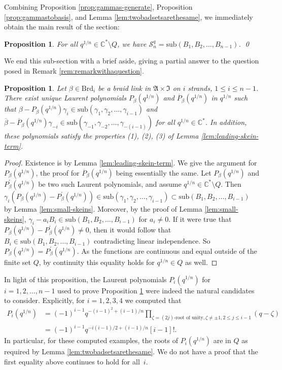 \documentclass[12pt,
	]{amsart}
\newtheorem{proposition}[theorem]{Proposition}
\theoremstyle{definition}
\renewcommand{\bar}{\overline}
\newcommand{\mrm}[1]{\mathrm{#1}}
\newcommand{\mbb}[1]{\mathbb{#1}}
\newcommand{\mcal}[1]{\mathcal{#1}}
\newcommand{\mfrak}[1]{\mathfrak{#1}}
\newcommand{\lp}{\left(}\newcommand{\rp}{\right)}
\newcommand{\sub}[1]{\mrm{sub}\lp#1\rp}
\newcommand{\rev}[1]{\bar{#1}}
\newcommand{\C}{\mbb{C}}
\newcommand{\sC}{\C^\ast}
\newcommand{\sk}{\mcal{S}_n^q}
\newcommand{\ann}{\mfrak{A}}
\newcommand{\intt}{\mfrak{I}}
\newcommand{\badset}{Q}
\newcommand{\qroot}{q^{1/n}}
\newcommand{\braid}{\mrm{Brd}}
\begin{document}
Combining Proposition \ref{prop:gammas-generate}, Proposition \ref{prop:gammastobasis}, and Lemma \ref{lem:twobadsetsarethesame}, we immediately obtain the main result of the section:

\begin{proposition}\label{cor:basisgenerates}
For all $\qroot\in\sC\setminus\badset$, we have $\sk=\sub{B_1,B_2,\dots,B_{n-1}}$.  \qed
\end{proposition}

We end this sub-section with a brief aside, giving a partial answer to the question posed in Remark \ref{rem:remarkwithaquestion}.    

\begin{proposition}
Let $\beta\in\braid_i$ be a braid link in $\ann\times\intt$ on $i$ strands, $1\leq i\leq n-1$.  There exist unique Laurent polynomials $P_\beta(\qroot)$ and $\rev{P}_\beta(\qroot)$ in $\qroot$ such that $\beta-P_\beta(\qroot)\gamma_i\in\sub{\gamma_1,\gamma_2,\dots,\gamma_{i-1}}$ and $\rev{\beta}-\rev{P}_\beta(\qroot)\gamma_{-i}\in\sub{\gamma_{-1},\gamma_{-2},\dots,\gamma_{-(i-1)}}$ for all $\qroot\in\sC$.  In addition, these polynomials satisfy the properties (1), (2), (3) of Lemma {\upshape\ref{lem:leading-skein-term}}.  
\end{proposition}

\begin{proof}
Existence is by Lemma {\upshape\ref{lem:leading-skein-term}}.  We give the argument for $P_\beta(\qroot)$, the proof for $\rev{P}_\beta(\qroot)$ being essentially the same.  Let $P_\beta(\qroot)$ and $P^\prime_\beta(\qroot)$ be two such Laurent polynomials, and assume $\qroot\in\sC\setminus\badset$.  Then $\gamma_i(P_\beta(\qroot)-P^\prime_\beta(\qroot))\in\sub{\gamma_1,\gamma_2,\dots,\gamma_{i-1}}\subset\sub{B_1,B_2,\dots,B_{i-1}}$ by Lemma \ref{lem:small-skeins}.  Moreover, by the proof of Lemma \ref{lem:small-skeins}, $\gamma_i-a_i B_i\in\sub{B_1,B_2,\dots,B_{i-1}}$ for $a_i\neq0$.  If it were true that $P_\beta(\qroot)-P^\prime_\beta(\qroot)\neq0$, then it would follow that $B_i\in\sub{B_1,B_2,\dots,B_{i-1}}$ contradicting linear independence.  So $P_\beta(\qroot)=P^\prime_\beta(\qroot)$. As the functions are continuous and equal outside of the finite set $Q$, by continuity this equality holds for $\qroot\in\badset$ as well. 
\end{proof}

In light of this proposition, the Laurent polynomials $P_i(\qroot)$ for $i=1,2,\dots,n-1$ used to prove Proposition \ref{cor:basisgenerates} were indeed the natural candidates to consider.  Explicitly, for $i=1,2,3,4$ we computed that  
\begin{align*}
P_i(\qroot)&=(-1)^{i-1}q^{-(i-1)^2+(i-1)/n}\prod_{\zeta=(2j)\text{-root of unity}, \zeta\neq\pm1, 2\leq j\leq i-1}(q-\zeta)
\\&=(-1)^{i-1}q^{-i(i-1)/2+(i-1)/n}[i-1]!.
\end{align*}
In particular, for these computed examples, the roots of $P_i(\qroot)$ are in $\badset$ as required by Lemma \ref{lem:twobadsetsarethesame}.  We do not have a proof that the first equality above  continues to hold for  all~$i$.
\end{document}
